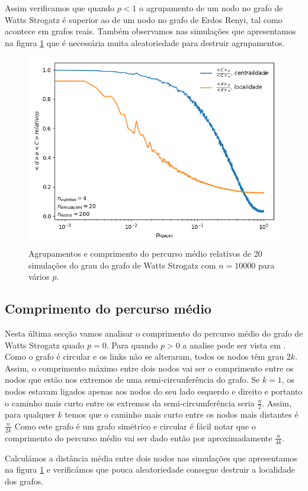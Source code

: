 \documentclass[conference, twocolumn]{IEEEtran}
\theoremstyle{plain}
\theoremstyle{definition}
\theoremstyle{remark}
\begin{document}
Assim verificamos que quando $p<1$ o agrupamento de um nodo no grafo de Watts Strogatz é superior ao de um nodo no grafo de Erdos Renyi, tal como acontece em grafos reais.\cite{3} Também observamos nas simulações que apresentamos na figura \ref{fig:watts_strogatz_clustering_coefficient_and_average_path_length} que é necessária muita aleatoriedade para destruir agrupamentos.

\begin{figure}[h]
    \centering
    \includegraphics[width=1\linewidth]{images/watts_strogatz_clustering_coefficient_and_average_path_length.png}
    \caption{\small Agrupamentos e comprimento do percurso médio relativos de 20 simulações do grau do grafo de Watts Strogatz com $n = 10000$ para vários $p$.}
    \label{fig:watts_strogatz_clustering_coefficient_and_average_path_length}
\end{figure}

\subsection{Comprimento do percurso médio}
Nesta última secção vamos analisar o comprimento do percurso médio do grafo de Watts Strogatz quado $p=0$. Para quando $p>0$ a analise pode ser vista em \cite{2}.
Como o grafo é circular e os links não se alteraram, todos os nodos têm grau $2k$. Assim, o comprimento máximo entre dois nodos vai ser o comprimento entre os nodos que estão nos extremos de uma semi-circunferência do grafo.
Se $k=1$, os nodos estavam ligados apenas aos nodos do seu lado esquerdo e direito e portanto o caminho mais curto entre os extremos da semi-circumferência seria $\frac{n}{2}$. Assim, para qualquer $k$ temos que o caminho mais curto entre os nodos mais distantes é $\frac{n}{2k}$
Como este grafo é um grafo simétrico e circular é fácil notar que o comprimento do percurso médio vai ser dado então por aproximadamente $\frac{n}{4k}$.

Calculámos a distância média entre dois nodos nas simulações que apresentamos na figura \ref{fig:watts_strogatz_clustering_coefficient_and_average_path_length} e verificámos que pouca aleatoriedade consegue destruir a localidade dos grafos.



\end{document}

